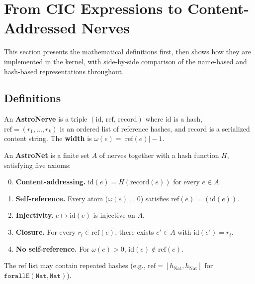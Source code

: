 \section{From CIC Expressions to Content-Addressed Nerves}\label{sec:kernel}

This section presents the mathematical definitions first, then shows how they are implemented in the kernel, with side-by-side comparison of the name-based and hash-based representations throughout.

\subsection{Definitions}\label{sec:definitions}

\begin{definition}[AstroNerve]
An \textbf{AstroNerve} is a triple $(\mathrm{id},\, \mathrm{ref},\, \mathrm{record})$ where $\mathrm{id}$ is a hash, $\mathrm{ref} = (r_1, \ldots, r_k)$ is an ordered list of reference hashes, and $\mathrm{record}$ is a serialized content string.  The \textbf{width} is $\omega(e) = |\mathrm{ref}(e)| - 1$.
\end{definition}

\begin{definition}[AstroNet]\label{def:ca-hypergraph}\label{def:well-formed}
An \textbf{AstroNet} is a finite set $A$ of nerves together with a hash function $H$, satisfying five axioms:
\begin{enumerate}
  \setcounter{enumi}{-1}
  \item \textbf{Content-addressing.} $\mathrm{id}(e) = H(\mathrm{record}(e))$ for every $e \in A$.
  \item \textbf{Self-reference.} Every atom ($\omega(e) = 0$) satisfies $\mathrm{ref}(e) = (\mathrm{id}(e))$.
  \item \textbf{Injectivity.} $e \mapsto \mathrm{id}(e)$ is injective on $A$.
  \item \textbf{Closure.} For every $r_i \in \mathrm{ref}(e)$, there exists $e' \in A$ with $\mathrm{id}(e') = r_i$.
  \item \textbf{No self-reference.} For $\omega(e) > 0$, $\mathrm{id}(e) \notin \mathrm{ref}(e)$.
\end{enumerate}
The $\mathrm{ref}$ list may contain repeated hashes (e.g., $\mathrm{ref} = [h_{\mathrm{Nat}}, h_{\mathrm{Nat}}]$ for $\texttt{forallE}(\texttt{Nat}, \texttt{Nat})$).
\end{definition}

